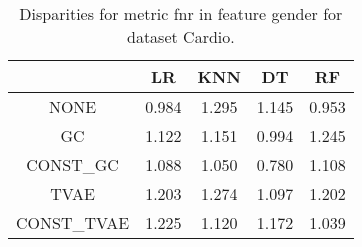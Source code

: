 \begin{table}
\caption{Disparities for metric fnr in feature gender for dataset Cardio.}
\label{tab:disp-CARDIO-gender-fnr}
\begin{tabular}{ccccc}
\toprule
 & LR & KNN & DT & RF \\
\midrule
NONE & 0.984 & 1.295 & 1.145 & 0.953 \\
GC & 1.122 & 1.151 & 0.994 & 1.245 \\
CONST\_GC & 1.088 & 1.050 & 0.780 & 1.108 \\
TVAE & 1.203 & 1.274 & 1.097 & 1.202 \\
CONST\_TVAE & 1.225 & 1.120 & 1.172 & 1.039 \\
\bottomrule
\end{tabular}
\end{table}
